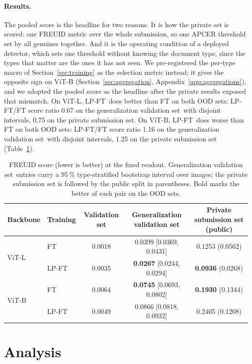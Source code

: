 \documentclass[10pt]{article}
\newcommand{\ci}[2]{{\footnotesize[#1, #2]}}
\newcommand{\lpft}{LP-FT}
\newcommand{\genval}{generalization validation set}
\newcommand{\Genval}{Generalization validation set}
\begin{document}
\paragraph{Results.}
The pooled score is the headline for two reasons. It is how the private set is scored: one FREUID metric over the whole submission, so one APCER threshold set by all genuines together. And it is the operating condition of a deployed detector, which sets one threshold without knowing the document type, since the types that matter are the ones it has not seen. We pre-registered the per-type macro of Section~\ref{sec:training} as the selection metric instead; it gives the opposite sign on ViT-B (Section~\ref{sec:aggregation}, Appendix~\ref{app:aggregations}), and we adopted the pooled score as the headline after the private results exposed that mismatch. On ViT-L, \lpft\ does better than FT on both OOD sets: \lpft/FT score ratio 0.67 on the \genval\ with disjoint intervals, 0.75 on the private submission set. On ViT-B, \lpft\ does worse than FT on both OOD sets: \lpft/FT score ratio 1.16 on the \genval\ with disjoint intervals, 1.25 on the private submission set (Table~\ref{tab:main}).

\begin{table}[t]
  \caption{FREUID score (lower is better) at the fixed readout. \Genval\ entries carry a 95\,\% type-stratified bootstrap interval over images; the private submission set is followed by the public split in parentheses. Bold marks the better of each pair on the OOD sets.}
  \label{tab:main}
  \centering
  \small
  \begin{tabular}{@{}llccc@{}}
    \toprule
    Backbone & Training & Validation set & \Genval & Private submission set (public) \\
    \midrule
    \multirow{2}{*}{ViT-L} & FT    & 0.0018 & 0.0399 \ci{0.0369}{0.0431} & 0.1253 (0.0562) \\
                           & \lpft & 0.0035 & \textbf{0.0267} \ci{0.0244}{0.0294} & \textbf{0.0936} (0.0268) \\
    \midrule
    \multirow{2}{*}{ViT-B} & FT    & 0.0064 & \textbf{0.0745} \ci{0.0693}{0.0802} & \textbf{0.1930} (0.1344) \\
                           & \lpft & 0.0049 & 0.0866 \ci{0.0818}{0.0932} & 0.2405 (0.1208) \\
    \bottomrule
  \end{tabular}
\end{table}

\section{Analysis}
\end{document}
